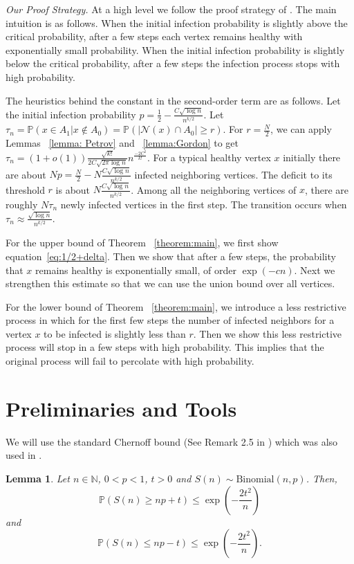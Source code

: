 \documentclass[reqno,11pt]{amsart}
\newtheorem{lemma}[theorem]{Lemma}
\renewcommand{\leq}{\leqslant}
\renewcommand{\geq}{\geqslant}
\begin{document}
\emph{Our Proof Strategy.} At a high level we follow the proof strategy of \cite{balogh_bollobas_morris_2009}. The main intuition is as follows. When the initial infection probability is slightly above the critical probability, after a few steps each vertex remains healthy with exponentially small probability. When the initial infection probability is slightly below the critical probability, after a few steps the infection process stops with high probability.

The heuristics behind the constant in the second-order term are as follows. Let the initial infection probability $p=\frac{1}{2}-\frac{C\sqrt{\log n}}{n^{k/2}}$. Let $\tau_n=\mathbb{P}(x \in A_1| x \notin A_0)=\mathbb{P}(|\mathcal{N}(x) \cap A_0|\geq r)$. For $r=\frac{N}{2}$, we can apply Lemmas ~\ref{lemma: Petrov} and ~\ref{lemma:Gordon} to get $\tau_n=(1+o(1))\frac{\sqrt{k!}}{2C \sqrt{2\pi \log n}} n^{\frac{-2C^2}{k!}}$. For a typical healthy vertex $x$ initially there are about $Np=\frac{N}{2}-N\frac{C\sqrt{\log n}}{n^{k/2}}$ infected neighboring vertices. The deficit to its threshold $r$ is about $N\frac{C\sqrt{\log n}}{n^{k/2}}$. Among all the neighboring vertices of $x$, there are roughly $N\tau_n$ newly infected vertices in the first step. The transition occurs when $\tau_n \approx \frac{\sqrt{\log n}}{n^{k/2}}$. 

For the upper bound of Theorem ~\ref{theorem:main}, we first show equation~\ref{eq:1/2+delta}. Then we show that after a few steps, the probability that $x$ remains healthy is exponentially small, of order $\exp(-cn)$. Next we strengthen this estimate so that we can use the union bound over all vertices. 

For the lower bound of Theorem ~\ref{theorem:main}, we introduce a less restrictive process in which for the first few steps the number of infected neighbors for a vertex $x$ to be infected is slightly less than $r$. Then we show this less restrictive process will stop in a few steps with high probability. This implies that the original process will fail to percolate with high probability.



\section{Preliminaries and Tools}
We will use the standard Chernoff bound (See Remark 2.5 in \cite{Random_graphs}) which was also used in \cite{balogh_bollobas_morris_2009}.
\begin{lemma} \label{lemmaA1}
Let $n \in \mathbb{N}$, $0<p<1$, $t>0$ and $S(n) \sim \text{Binomial}(n,p)$. Then,
$$\mathbb{P}(S(n) \geq np+t) \leq \exp\left(-\frac{2t^2}{n}\right)$$
and
$$\mathbb{P}(S(n) \leq np-t) \leq \exp\left(-\frac{2t^2}{n}\right).$$
\end{lemma}
\end{document}
